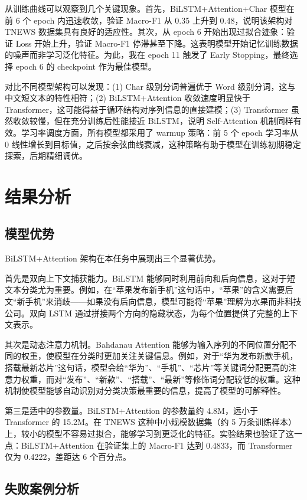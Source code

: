 \documentclass[a4paper]{article}
\begin{document}
从训练曲线可以观察到几个关键现象。首先，BiLSTM+Attention+Char 模型在前 6 个 epoch 内迅速收敛，验证 Macro-F1 从 0.35 上升到 0.48，说明该架构对 TNEWS 数据集具有良好的适应性。其次，从 epoch 6 开始出现过拟合迹象：验证 Loss 开始上升，验证 Macro-F1 停滞甚至下降。这表明模型开始记忆训练数据的噪声而非学习泛化特征。为此，我在 epoch 11 触发了 Early Stopping，最终选择 epoch 6 的 checkpoint 作为最佳模型。

对比不同模型架构可以发现：(1) Char 级别分词普遍优于 Word 级别分词，这与中文短文本的特性相符；(2) BiLSTM+Attention 收敛速度明显快于 Transformer，这可能得益于循环结构对序列信息的直接建模；(3) Transformer 虽然收敛较慢，但在充分训练后性能接近 BiLSTM，说明 Self-Attention 机制同样有效。学习率调度方面，所有模型都采用了 warmup 策略：前 5 个 epoch 学习率从 0 线性增长到目标值，之后按余弦曲线衰减，这种策略有助于模型在训练初期稳定探索，后期精细调优。

\section{结果分析}

\subsection{模型优势}

BiLSTM+Attention 架构在本任务中展现出三个显著优势。

首先是双向上下文捕获能力。BiLSTM 能够同时利用前向和后向信息，这对于短文本分类尤为重要。例如，在“苹果发布新手机”这句话中，“苹果”的含义需要后文“新手机”来消歧——如果没有后向信息，模型可能将“苹果”理解为水果而非科技公司。双向 LSTM 通过拼接两个方向的隐藏状态，为每个位置提供了完整的上下文表示。

其次是动态注意力机制。Bahdanau Attention 能够为输入序列的不同位置分配不同的权重，使模型在分类时更加关注关键信息。例如，对于“华为发布新款手机，搭载最新芯片”这句话，模型会给“华为”、“手机”、“芯片”等关键词分配更高的注意力权重，而对“发布”、“新款”、“搭载”、“最新”等修饰词分配较低的权重。这种机制使模型能够自动识别对分类决策最重要的信息，提高了模型的可解释性。

第三是适中的参数量。BiLSTM+Attention 的参数量约 4.8M，远小于 Transformer 的 15.2M。在 TNEWS 这种中小规模数据集（约 5 万条训练样本）上，较小的模型不容易过拟合，能够学习到更泛化的特征。实验结果也验证了这一点：BiLSTM+Attention 在验证集上的 Macro-F1 达到 0.4833，而 Transformer 仅为 0.4222，差距达 6 个百分点。

\subsection{失败案例分析}
\end{document}
